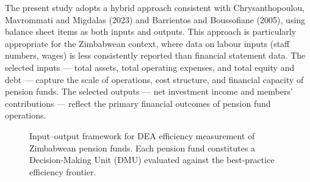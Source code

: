 \documentclass[12pt,a4paper]{article}
\begin{document}
The present study adopts a hybrid approach consistent with Chrysanthopoulou, Mavrommati and Migdalas (2023) and Barrientos and Boussofiane (2005), using balance sheet items as both inputs and outputs. This approach is particularly appropriate for the Zimbabwean context, where data on labour inputs (staff numbers, wages) is less consistently reported than financial statement data. The selected inputs --- total assets, total operating expenses, and total equity and debt --- capture the scale of operations, cost structure, and financial capacity of pension funds. The selected outputs --- net investment income and members' contributions --- reflect the primary financial outcomes of pension fund operations.

\begin{figure}[H]
\centering
{}
\caption{Input--output framework for DEA efficiency measurement of Zimbabwean pension funds. Each pension fund constitutes a Decision-Making Unit (DMU) evaluated against the best-practice efficiency frontier.}
\label{fig:dea_framework}
\end{figure}
\end{document}
